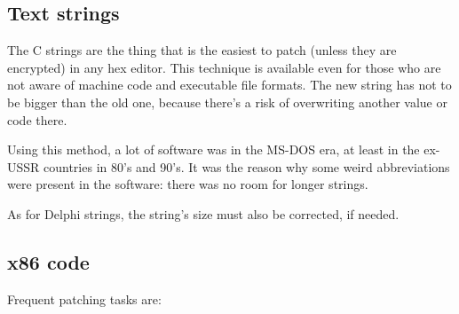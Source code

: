 
\subsection{Text strings}

The C strings are the thing that is the easiest to patch (unless they are encrypted) in any hex editor.
This technique is available even for those who are not aware of machine code and executable file formats.
The new string has not to be bigger than the old one, because there's a risk of overwriting another value or code
there.

Using this method, a lot of software was  in the MS-DOS era, at least in the ex-USSR countries in 80's
and 90's.
It was the reason why some weird abbreviations were present in the  software: there was no room for
longer strings.


As for Delphi strings, the string's size must also be corrected, if needed.

\subsection{x86 code}
\label{x86_patching}

Frequent patching tasks are:

